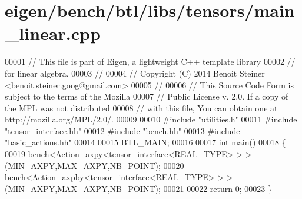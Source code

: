 \hypertarget{eigen_2bench_2btl_2libs_2tensors_2main__linear_8cpp_source}{}\section{eigen/bench/btl/libs/tensors/main\+\_\+linear.cpp}
\label{eigen_2bench_2btl_2libs_2tensors_2main__linear_8cpp_source}

\begin{DoxyCode}
00001 \textcolor{comment}{// This file is part of Eigen, a lightweight C++ template library}
00002 \textcolor{comment}{// for linear algebra.}
00003 \textcolor{comment}{//}
00004 \textcolor{comment}{// Copyright (C) 2014 Benoit Steiner <benoit.steiner.goog@gmail.com>}
00005 \textcolor{comment}{//}
00006 \textcolor{comment}{// This Source Code Form is subject to the terms of the Mozilla}
00007 \textcolor{comment}{// Public License v. 2.0. If a copy of the MPL was not distributed}
00008 \textcolor{comment}{// with this file, You can obtain one at http://mozilla.org/MPL/2.0/.}
00009 
00010 \textcolor{preprocessor}{#include "utilities.h"}
00011 \textcolor{preprocessor}{#include "tensor\_interface.hh"}
00012 \textcolor{preprocessor}{#include "bench.hh"}
00013 \textcolor{preprocessor}{#include "basic\_actions.hh"}
00014 
00015 BTL\_MAIN;
00016 
00017 \textcolor{keywordtype}{int} main()
00018 \{
00019   bench<Action\_axpy<tensor\_interface<REAL\_TYPE> > >(MIN\_AXPY,MAX\_AXPY,NB\_POINT);
00020   bench<Action\_axpby<tensor\_interface<REAL\_TYPE> > >(MIN\_AXPY,MAX\_AXPY,NB\_POINT);
00021 
00022   \textcolor{keywordflow}{return} 0;
00023 \}
\end{DoxyCode}
